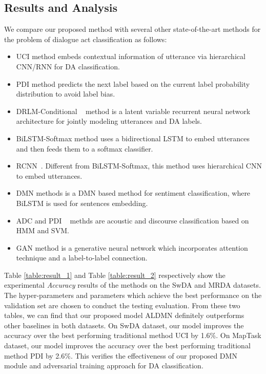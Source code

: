 \documentclass[conference]{IEEEtran}
\begin{document}
	\subsection{ Results and Analysis}
	We compare our proposed method with several other state-of-the-art methods for the problem of dialogue act classification as follows:
	\begin{itemize}
		\item UCI \cite{liu2017using} method embeds contextual information of utterance via hierarchical CNN/RNN for DA classification.
		\item PDI \cite{tran2017aprocessings} method predicts the next label based on the current label probability distribution to avoid label bias.
		\item DRLM-Conditional ~\cite{ji2016a} method is a latent variable recurrent neural network architecture for jointly modeling utterances and DA labels.
		\item BiLSTM-Softmax \cite{khanpour2016dialogue} method uses a bidirectional LSTM to embed utterances and then feeds them to a softmax classifier.
		\item RCNN~\cite{kalchbrenner2013recurrent}. Different from BiLSTM-Softmax, this method uses hierarchical CNN to embed  utterances.
		\item DMN \cite{kumar2016ask} methods is a DMN based method for sentiment classification, where BiLSTM is used for sentences embedding.%
		\item ADC \cite{julia2010dialog} and PDI ~\cite{tran2017aprocessings} methds are acoustic and discourse classification based on HMM and SVM.
		\item GAN \cite{tran2017bgenerative} method is a generative neural network which incorporates attention technique and a label-to-label connection.
	\end{itemize}
	Table \ref{table:result_1} and Table \ref{table:result_2} respectively show the experimental \textit{Accuracy} results of the methods on the SwDA and MRDA datasets. The hyper-parameters and parameters which achieve the best performance on the validation set are chosen to conduct the testing evaluation. From these two tables, we can find that our proposed model ALDMN definitely outperforms other baselines in both datasets. On SwDA dataset, our model improves the accuracy over the best performing traditional method UCI by 1.6\%. On MapTask dataset, our model improves the accuracy over the best performing traditional method PDI by 2.6\%. This verifies the effectiveness of our proposed DMN module and adversarial training approach for DA classification.
\end{document}
